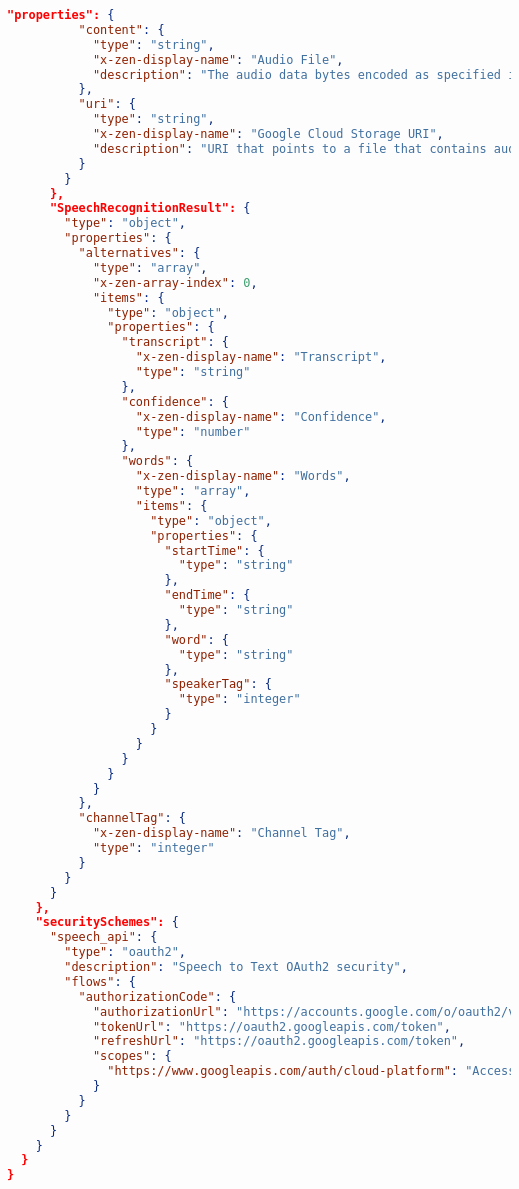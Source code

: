 \begin{lstlisting}[language=json,basicstyle=\ttfamily\tiny,numberstyle=\tiny]
        "properties": {
          "content": {
            "type": "string",
            "x-zen-display-name": "Audio File",
            "description": "The audio data bytes encoded as specified in RecognitionConfig. Note: as with all bytes fields, proto buffers use a pure binary representation, whereas JSON representations use base64."
          },
          "uri": {
            "type": "string",
            "x-zen-display-name": "Google Cloud Storage URI",
            "description": "URI that points to a file that contains audio data bytes as specified in RecognitionConfig. The file must not be compressed (for example, gzip). Currently, only Google Cloud Storage URIs are supported, which must be specified in the following format: gs://bucketName/object_name"
          }
        }
      },
      "SpeechRecognitionResult": {
        "type": "object",
        "properties": {
          "alternatives": {
            "type": "array",
            "x-zen-array-index": 0,
            "items": {
              "type": "object",
              "properties": {
                "transcript": {
                  "x-zen-display-name": "Transcript",
                  "type": "string"
                },
                "confidence": {
                  "x-zen-display-name": "Confidence",
                  "type": "number"
                },
                "words": {
                  "x-zen-display-name": "Words",
                  "type": "array",
                  "items": {
                    "type": "object",
                    "properties": {
                      "startTime": {
                        "type": "string"
                      },
                      "endTime": {
                        "type": "string"
                      },
                      "word": {
                        "type": "string"
                      },
                      "speakerTag": {
                        "type": "integer"
                      }
                    }
                  }
                }
              }
            }
          },
          "channelTag": {
            "x-zen-display-name": "Channel Tag",
            "type": "integer"
          }
        }
      }
    },
    "securitySchemes": {
      "speech_api": {
        "type": "oauth2",
        "description": "Speech to Text OAuth2 security",
        "flows": {
          "authorizationCode": {
            "authorizationUrl": "https://accounts.google.com/o/oauth2/v2/auth",
            "tokenUrl": "https://oauth2.googleapis.com/token",
            "refreshUrl": "https://oauth2.googleapis.com/token",
            "scopes": {
              "https://www.googleapis.com/auth/cloud-platform": "Access cloud platform"
            }
          }
        }
      }
    }
  }
}
\end{lstlisting}